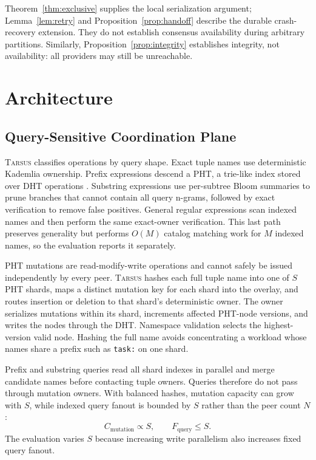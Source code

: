 \documentclass[conference]{IEEEtran}
\newcommand{\system}{\textsc{Tarsus}\xspace}
\begin{document}
Theorem~\ref{thm:exclusive} supplies the local serialization argument;
Lemma~\ref{lem:retry} and Proposition~\ref{prop:handoff} describe the durable
crash-recovery extension. They do not establish consensus availability during
arbitrary partitions. Similarly, Proposition~\ref{prop:integrity} establishes
integrity, not availability: all providers may still be unreachable.

\section{Architecture}
\label{sec:architecture}

\subsection{Query-Sensitive Coordination Plane}

\system classifies operations by query shape. Exact tuple names use deterministic
Kademlia ownership. Prefix expressions descend a PHT, a trie-like index stored
over DHT operations \cite{RamabhadranPHT}. Substring expressions use
per-subtree Bloom summaries to prune branches that cannot contain all query
n-grams, followed by exact verification to remove false positives. General
regular expressions scan indexed names and then perform the same exact-owner
verification. This last path preserves generality but performs $O(M)$ catalog
matching work for $M$ indexed names, so the evaluation reports it separately.

PHT mutations are read-modify-write operations and cannot safely be issued
independently by every peer. \system hashes each full tuple name into one of
$S$ PHT shards, maps a distinct mutation key for each shard into the overlay,
and routes insertion or deletion to that shard's deterministic owner. The
owner serializes mutations within its shard, increments affected PHT-node
versions, and writes the nodes through the DHT. Namespace validation selects
the highest-version valid node. Hashing the full name avoids concentrating a
workload whose names share a prefix such as \texttt{task:} on one shard.

Prefix and substring queries read all shard indexes in parallel and merge
candidate names before contacting tuple owners. Queries therefore do not pass
through mutation owners. With balanced hashes, mutation capacity can grow with
$S$, while indexed query fanout is bounded by $S$ rather than the peer count
$N$:
\[
  C_{\mathrm{mutation}} \propto S,
  \qquad F_{\mathrm{query}} \le S.
\]
The evaluation varies $S$ because increasing write parallelism also increases
fixed query fanout.
\end{document}
